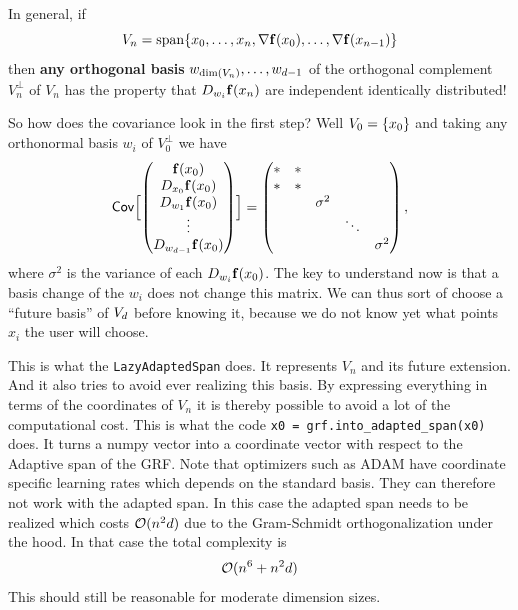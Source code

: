 In general, if
\[
	V_n = \operatorname{span}\{x_0, \dots, x_n, \nabla \mathbf{f}(x_0),\dots, \nabla \mathbf{f}(x_{n-1})\}
\]
then \textbf{any orthogonal basis} \(w_{\dim(V_n)}, \dots, w_{d-1}\) of the
orthogonal complement \(V_n^\perp\)  of \(V_n\) has the property that
\(D_{w_i} \mathbf{f}(x_n)\) are independent identically distributed!

So how does the covariance look in the first step? Well \(V_0 = \{x_0\}\)
and taking any orthonormal basis \(w_i\) of \(V_0^\perp\) we have
\[
	\mathsf{Cov}\Bigl[\begin{pmatrix}
		\mathbf{f}(x_0)
		\\
		D_{x_0}\mathbf{f}(x_0)
		\\
		D_{w_1} \mathbf{f}(x_0)
		\\
		\vdots
		\\
		D_{w_{d-1}}\mathbf{f}(x_0)
	\end{pmatrix}
	\Bigr]
	= \begin{pmatrix}
		* & *\\
		* & *\\
		& & \sigma^2 \\
		& & & \ddots
		\\
		& & & &\sigma^2 
	\end{pmatrix},
\]
where \(\sigma^2\) is the variance of each \(D_{w_i}\mathbf{f}(x_0)\). The key to
understand now is that a basis change of the \(w_i\) does not change this
matrix. We can thus sort of choose a ``future basis'' of \(V_d\) before
knowing it, because we do not know yet what points \(x_i\) the user will choose.

This is what the \texttt{LazyAdaptedSpan} does. It represents \(V_n\)
and its future extension. And it also tries to avoid ever
realizing this basis. By expressing everything in terms of the coordinates of
\(V_n\) it is thereby possible to avoid a lot of the computational cost.
This is what the code \verb|x0 = grf.into_adapted_span(x0)| does. It turns a
numpy vector into a coordinate vector with respect to the Adaptive span of
the GRF. Note that optimizers such as ADAM have coordinate specific learning
rates which depends on the standard basis. They can therefore not work
with the adapted span. In this case the adapted span needs to be realized which
costs \(\mathcal{O}(n^2d)\) due to the Gram-Schmidt orthogonalization under the hood.
In that case the total complexity is
\[
\mathcal{O}(n^6 + n^2d)
\]
This should still be reasonable for moderate dimension sizes.

